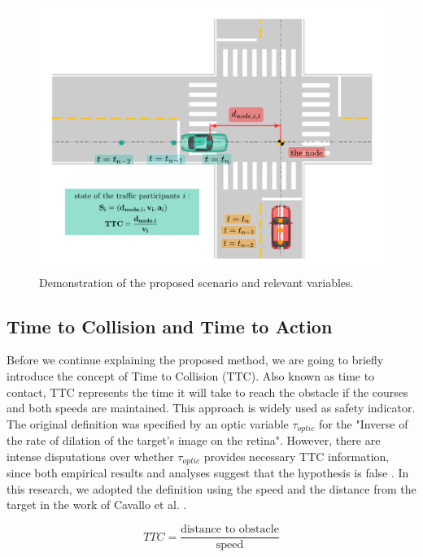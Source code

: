 \documentclass[twocolumn,10pt]{asme2e}
\begin{document}
\begin{figure}[t]
\begin{center}
\includegraphics[scale=0.3]{intersection_concept.pdf}
\end{center}
\caption{Demonstration of the proposed scenario and relevant variables.}
\label{model_demo} 
\end{figure}


\subsection{Time to Collision and Time to Action}


Before we continue explaining the proposed method, we are going to briefly introduce the concept of Time to Collision (TTC). Also known as time to contact, TTC represents the time it will take to reach the obstacle \cite{TTC} if the courses and both speeds are maintained. This approach is widely used as safety indicator. The original definition was specified by an optic variable $\tau_{optic}$ for the "Inverse of the rate of dilation of the target's image on the retina". However, there are intense disputations over whether $\tau_{optic}$ provides necessary TTC information, since both empirical results and analyses suggest that the hypothesis is false \cite{tau}. In this research, we adopted the definition using the speed and the distance from the target in the work of Cavallo et al. \cite{TTC}.

\begin{equation}
TTC = \frac{\text{distance to obstacle}}{\text{speed}}
\label{TTC_2}
\end{equation}
\end{document}
